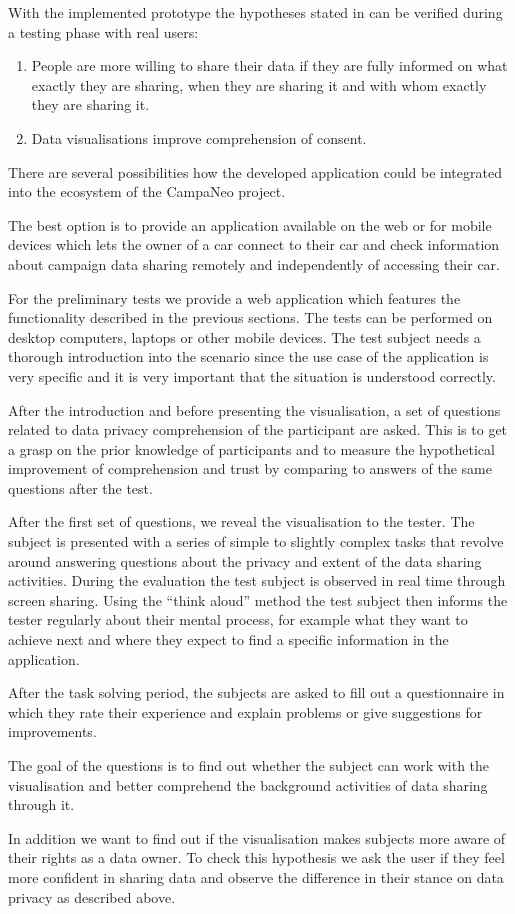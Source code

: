 \documentclass[../paper.tex]{subfiles}
\begin{document}
  With the implemented prototype the hypotheses stated in  can be verified during a
  testing phase with real users:
  \begin{enumerate}
    \item People are more willing to share their data if they are fully informed
          on what exactly they are sharing, when they are sharing it and with
          whom exactly they are sharing it.
    \item Data visualisations improve comprehension of consent.
  \end{enumerate}
  There are several possibilities how the developed application could be
  integrated into the ecosystem of the CampaNeo project.

  The best option is to provide an application available
  on the web or for mobile devices which lets the owner of a car connect to
  their car and check information about campaign data sharing remotely and
  independently of accessing their car.

  For the preliminary tests we provide a web application which features the functionality described in the
  previous sections. The tests can be performed on desktop computers, laptops
  or other mobile devices. The test subject needs a thorough introduction
  into the scenario since the use case of the application is very specific and
  it is very important that the situation is understood correctly.

  After the introduction and before presenting the visualisation, a set of questions related to data privacy comprehension of the participant are asked.
  This is to get a grasp on the prior knowledge of participants and to measure the hypothetical improvement of comprehension and trust by comparing to answers of the same questions after the test.

  After the first set of questions, we reveal the visualisation to the tester. The subject is presented with
  a series of simple to slightly complex tasks that revolve around answering
  questions about the privacy and extent of the data sharing activities.
  During the evaluation the test subject is observed in real time
  through screen sharing. Using the “think aloud” method the test subject then
  informs the tester regularly about their mental process, for example what
  they want to achieve next and where they expect to find a specific information
  in the application.

  After the task solving period, the subjects are asked to fill out a
  questionnaire in which they rate their experience and explain problems or
  give suggestions for improvements.

  The goal of the questions is to find out whether the subject can work with the visualisation and better comprehend the background activities of data sharing through it.

  In addition we want to find out if the visualisation makes subjects more
  aware of their rights as a data owner. To check this hypothesis we ask the user if they feel more confident in sharing data and observe the difference in their stance on data privacy as described above.
\end{document}
